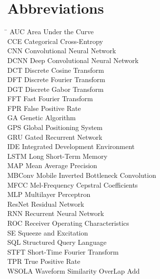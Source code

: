 

\chapter*{Abbreviations}
\begin{tabbing}
    \hspace{50mm}\=\kill
    AUC \> Area Under the Curve \\
    CCE \> Categorical Cross-Entropy \\
    CNN \> Convolutional Neural Network\\
    DCNN \> Deep Convolutional Neural Network\\
    DCT \> Discrete Cosine Transform\\
    DFT \> Discrete Fourier Transform\\
    DGT \> Discrete Gabor Transform\\
    FFT \> Fast Fourier Transform \\
    FPR \> False Positive Rate \\
    GA \> Genetic Algorithm\\ 
    GPS \> Global Positioning System\\
    GRU \> Gated Recurrent Network\\
    IDE \> Integrated Development Environment \\
    LSTM \> Long Short-Term Memory\\
    MAP \> Mean Average Precision\\
    MBConv \> Mobile Inverted Bottleneck Convolution\\
    MFCC \> Mel-Frequency Cepstral Coefficients\\
    MLP \> Multilayer Perceptron\\ 
    ResNet \> Residual Network\\
    RNN \> Recurrent Neural Network\\
    ROC \> Receiver Operating Characteristics\\ 
    SE \> Squeeze and Excitation \\
    SQL \> Structured Query Language\\
    STFT \> Short-Time Fourier Transform\\
    TPR \> True Positive Rate \\
    WSOLA \> Waveform Similarity OverLap Add\\
    
\end{tabbing}


